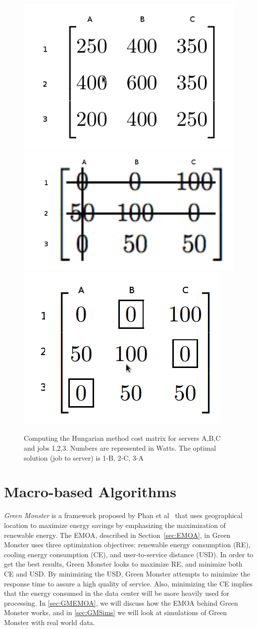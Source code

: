 \documentclass{sig-alternate}
\begin{document}
\begin{figure}[tb]
 \centering
 \includegraphics[height=0.25 \textwidth]{s}
 \includegraphics[height=0.20 \textwidth]{s2}
 \includegraphics[height=0.25 \textwidth]{s3}
 \caption{Computing the Hungarian method cost matrix for servers A,B,C and jobs 1,2,3. Numbers are represented in Watts. The optimal solution (job to server) is 1-B, 2-C, 3-A}
 \label{fig:HMA}
\end{figure}

\section{Macro-based Algorithms}
\label{sec:MacAl}

\emph{Green Monster} is a framework proposed by Phan et al~\cite{Phan} that uses geographical location to maximize energy savings by emphasizing the maximization of renewable energy. The EMOA, described in Section~\ref{sec:EMOA}, in Green Monster uses three optimization objectives: renewable energy consumption (RE), cooling energy consumption (CE), and user-to-service distance (USD). In order to get the best results, Green Monster looks to maximize RE, and minimize both CE and USD. By minimizing the USD, Green Monster attempts to minimize the response time to assure a high quality of service. Also, minimizing the CE implies that the energy consumed in the data center will be more heavily used for processing. In \ref{sec:GMEMOA}, we will discuss how the EMOA behind Green Monster works, and in \ref{sec:GMSims} we will look at simulations of Green Monster with real world data.
\end{document}
